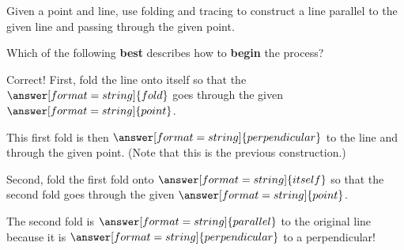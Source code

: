 \documentclass[nooutcomes]{ximera}
\begin{document}
\begin{problem}
Given a point and line, use folding and tracing to construct a line parallel to the given line and passing through the given point. 
\begin{image}
\end{image}
Which of the following \textbf{best} describes how to \textbf{begin} the process?  
\begin{multipleChoice}
\end{multipleChoice}
\begin{problem}
Correct!  First, fold the line onto itself so that the $\answer[format=string]{fold}$ goes through the given $\answer[format=string]{point}$.

This first fold is then $\answer[format=string]{perpendicular}$ to the line and through the given point.  (Note that this is the previous construction.)

Second, fold the first fold onto $\answer[format=string]{itself}$ so that the second fold goes through the given $\answer[format=string]{point}$.

The second fold is $\answer[format=string]{parallel}$ to the original line because it is $\answer[format=string]{perpendicular}$ to a perpendicular!  
\end{problem}
\end{problem}
\end{document}
